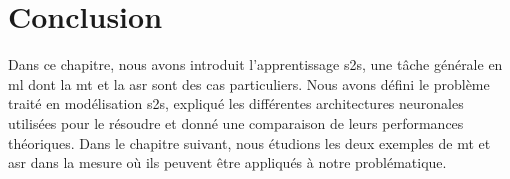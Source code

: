 \section{Conclusion}

Dans ce chapitre, nous avons introduit l'apprentissage \gls{s2s}, 
une tâche générale en \gls{ml} dont la \gls{mt} et la \gls{asr} sont des cas particuliers.
Nous avons défini le problème traité en modélisation \gls{s2s},
expliqué les différentes architectures neuronales utilisées pour le résoudre
et donné une comparaison de leurs performances théoriques.
Dans le chapitre suivant, nous étudions les deux exemples de \gls{mt} et \gls{asr}
dans la mesure où ils peuvent être appliqués à notre problématique.